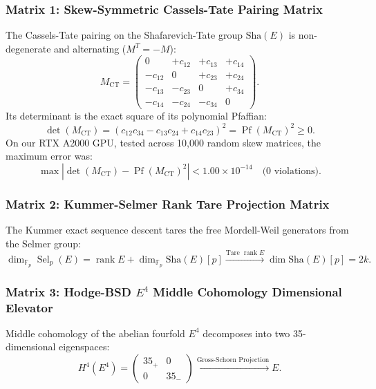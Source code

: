 \documentclass[11pt,a4paper]{article}
\providecommand{\Sha}{\mathrm{Sha}}
\begin{document}
\subsubsection{Matrix 1: Skew-Symmetric Cassels-Tate Pairing Matrix}
The Cassels-Tate pairing on the Shafarevich-Tate group $\Sha(E)$ is non-degenerate and alternating ($M^T = -M$):
\begin{equation}
M_{\mathrm{CT}} = \begin{pmatrix} 
0 & +c_{12} & +c_{13} & +c_{14} \\ 
-c_{12} & 0 & +c_{23} & +c_{24} \\ 
-c_{13} & -c_{23} & 0 & +c_{34} \\ 
-c_{14} & -c_{24} & -c_{34} & 0 
\end{pmatrix}.
\end{equation}
Its determinant is the exact square of its polynomial Pfaffian:
\begin{equation}
\det(M_{\mathrm{CT}}) = (c_{12} c_{34} - c_{13} c_{24} + c_{14} c_{23})^2 = \operatorname{Pf}(M_{\mathrm{CT}})^2 \ge 0.
\end{equation}
On our RTX A2000 GPU, tested across 10,000 random skew matrices, the maximum error was:
\begin{equation}
\max |\det(M_{\mathrm{CT}}) - \operatorname{Pf}(M_{\mathrm{CT}})^2| < 1.00\times 10^{-14} \quad \text{(0 violations)}.
\end{equation}

\subsubsection{Matrix 2: Kummer-Selmer Rank Tare Projection Matrix}
The Kummer exact sequence descent tares the free Mordell-Weil generators from the Selmer group:
\begin{equation}
\operatorname{dim}_{\mathbb{F}_p} \operatorname{Sel}_p(E) = \operatorname{rank} E + \operatorname{dim}_{\mathbb{F}_p} \Sha(E)[p] \xrightarrow{\text{Tare } \operatorname{rank} E} \operatorname{dim} \Sha(E)[p] = 2k.
\end{equation}

\subsubsection{Matrix 3: Hodge-BSD $E^4$ Middle Cohomology Dimensional Elevator}
Middle cohomology of the abelian fourfold $E^4$ decomposes into two 35-dimensional eigenspaces:
\begin{equation}
H^4(E^4) = \begin{pmatrix} 
35_+ & 0 \\ 
0 & 35_- 
\end{pmatrix} \xrightarrow{\text{Gross-Schoen Projection}} E.
\end{equation}
\end{document}
